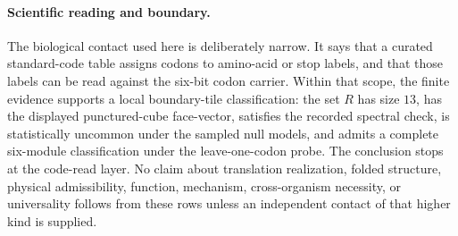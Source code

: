 \paragraph{Scientific reading and boundary.}
The biological contact used here is deliberately narrow.  It says that a curated standard-code table assigns codons to amino-acid or stop labels, and that those labels can be read against the six-bit codon carrier.  Within that scope, the finite evidence supports a local boundary-tile classification: the set $R$ has size $13$, has the displayed punctured-cube face-vector, satisfies the recorded spectral check, is statistically uncommon under the sampled null models, and admits a complete six-module classification under the leave-one-codon probe.  The conclusion stops at the code-read layer.  No claim about translation realization, folded structure, physical admissibility, function, mechanism, cross-organism necessity, or universality follows from these rows unless an independent contact of that higher kind is supplied.
